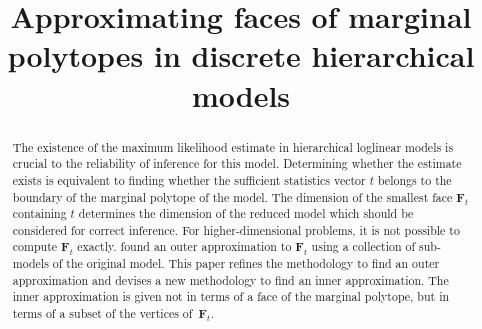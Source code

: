 \documentclass[aos,noinfoline]{imsart}
\newcommand{\Fbf}{\mathbf{F}}
\theoremstyle{remark}
\theoremstyle{definition}
\newcommand{\jo}[1]{\textcolor{green}{{J: #1}}}
\begin{document}
\begin{frontmatter}
\title{Approximating faces of marginal polytopes in discrete hierarchical models}

\begin{abstract}
  The existence of the maximum likelihood estimate in hierarchical loglinear models is crucial to the reliability of
  inference for this model. Determining whether the estimate exists is equivalent to finding whether the sufficient
  statistics vector $t$ belongs to the boundary of the marginal polytope of the model.  The dimension of the smallest
  face $\Fbf_t$ containing $t$ determines the dimension of the reduced model which should be considered for correct
  inference.  For higher-dimensional problems, it is not possible to %
 compute  $\Fbf_{t}$ exactly.
  \citet{MassamWang15:local_approach} found an outer approximation to $\Fbf_t$ using a collection of sub-models of the
  original model.  This paper refines the methodology to find an outer approximation and devises a new methodology to
  find an inner approximation.  The inner approximation is given not in terms of a face of the marginal polytope, but in
  terms of a subset of the vertices of~$\Fbf_t$.


\end{abstract}
\end{frontmatter}
\end{document}
